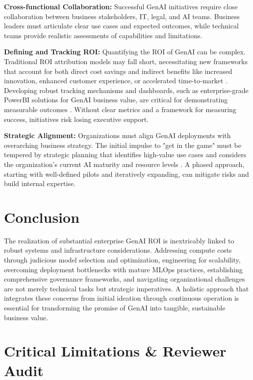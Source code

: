 \documentclass[10pt,twocolumn,letterpaper]{article}
\begin{document}
\textbf{Cross-functional Collaboration:} Successful GenAI initiatives require close collaboration between business stakeholders, IT, legal, and AI teams. Business leaders must articulate clear use cases and expected outcomes, while technical teams provide realistic assessments of capabilities and limitations.

\textbf{Defining and Tracking ROI:} Quantifying the ROI of GenAI can be complex. Traditional ROI attribution models may fall short, necessitating new frameworks that account for both direct cost savings and indirect benefits like increased innovation, enhanced customer experience, or accelerated time-to-market \cite{crossref_10_2139_ssrn_6374778}. Developing robust tracking mechanisms and dashboards, such as enterprise-grade PowerBI solutions for GenAI business value, are critical for demonstrating measurable outcomes \cite{github_ankitakapoor980_genai_roi_powerbi_dashboard}. Without clear metrics and a framework for measuring success, initiatives risk losing executive support.

\textbf{Strategic Alignment:} Organizations must align GenAI deployments with overarching business strategy. The initial impulse to "get in the game" must be tempered by strategic planning that identifies high-value use cases and considers the organization's current AI maturity and resource levels \cite{openalex_w4400993506}. A phased approach, starting with well-defined pilots and iteratively expanding, can mitigate risks and build internal expertise.


\section{Conclusion}


The realization of substantial enterprise GenAI ROI is inextricably linked to robust systems and infrastructure considerations. Addressing compute costs through judicious model selection and optimization, engineering for scalability, overcoming deployment bottlenecks with mature MLOps practices, establishing comprehensive governance frameworks, and navigating organizational challenges are not merely technical tasks but strategic imperatives. A holistic approach that integrates these concerns from initial ideation through continuous operation is essential for transforming the promise of GenAI into tangible, sustainable business value.






\section{Critical Limitations \& Reviewer Audit}
\end{document}
